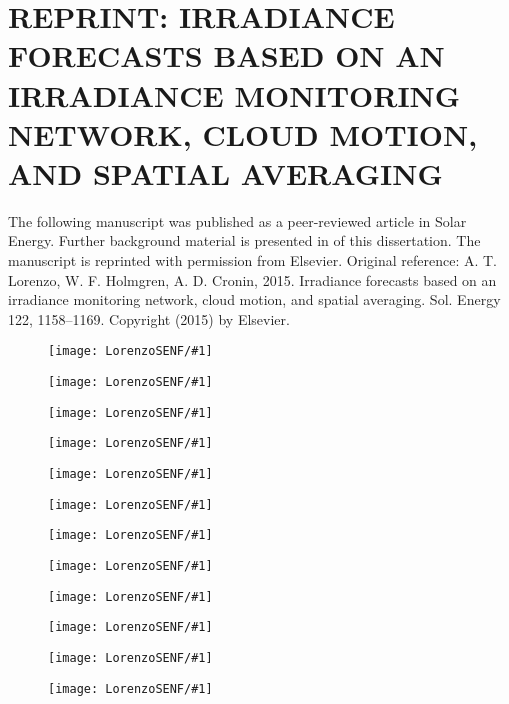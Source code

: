 \chapter{REPRINT: IRRADIANCE FORECASTS BASED ON AN IRRADIANCE MONITORING NETWORK, CLOUD MOTION, AND SPATIAL AVERAGING}
\label{app:network}
The following manuscript was published as a peer-reviewed article in
Solar Energy.
Further background material is presented in  of
this dissertation.
The manuscript is reprinted with permission from Elsevier. Original
reference: A. T. Lorenzo, W. F. Holmgren, A. D. Cronin,
2015. Irradiance forecasts based on an irradiance monitoring network,
cloud motion, and spatial averaging. Sol. Energy 122, 1158--1169.
Copyright (2015) by Elsevier.

\newcommand{\figNF}[1]{
\begin{figure}
\texttt{[image: LorenzoSENF/\#1]}
\end{figure}
}


\figNF{pg1}
\figNF{pg2}
\figNF{pg3}
\figNF{pg4}
\figNF{pg5}
\figNF{pg6}
\figNF{pg7}
\figNF{pg8}
\figNF{pg9}
\figNF{pg10}
\figNF{pg11}
\figNF{pg12}

